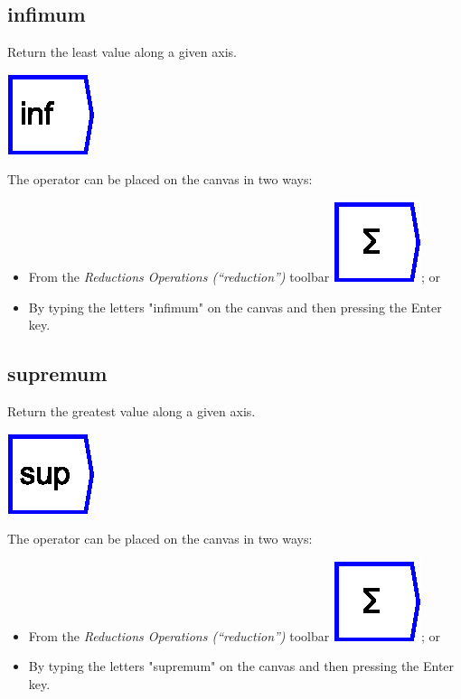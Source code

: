 \subsection{infimum}

\label{Operation:infimum} Return the least value along a given axis.

\includegraphics{images/infimum}

The operator can be placed on the canvas in two ways:
\begin{itemize}
\item From the \emph{Reductions Operations (``reduction'')} toolbar \includegraphics{images/sum};
or 
\item By typing the letters "infimum" on the canvas and then pressing
the Enter key.
\end{itemize}

\subsection{supremum}

\label{Operation:supremum} Return the greatest value along a given
axis.

\includegraphics{images/supremum}

The operator can be placed on the canvas in two ways:
\begin{itemize}
\item From the \emph{Reductions Operations (``reduction'')} toolbar \includegraphics{images/sum};
or 
\item By typing the letters "supremum" on the canvas and then pressing
the Enter key.
\end{itemize}

